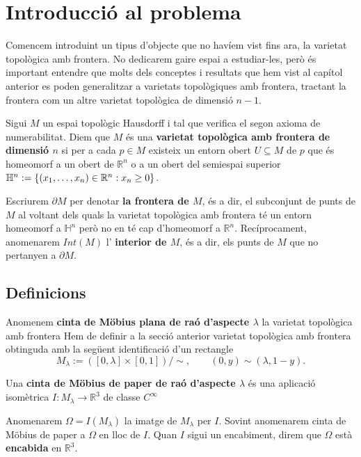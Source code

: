 \section{Introducció al problema}
Comencem introduint un tipus d'objecte que no havíem vist fins ara, la varietat topològica amb frontera. No dedicarem gaire espai a estudiar-les, però és important entendre que molts dels conceptes i resultats que hem vist al capítol anterior es poden generalitzar a varietats topològiques amb frontera, tractant la frontera com un altre varietat topològica de dimensió $n-1$.
\begin{defi}
    Sigui $M$ un espai topològic Hausdorff i tal que verifica el segon axioma de numerabilitat. Diem que $M$ és una \textbf{varietat topològica amb frontera de dimensió $n$} si per a cada $p\in M$ existeix un entorn obert $U\subseteq M$ de $p$ que és homeomorf a un obert de $\mathbb R^n$ o a un obert del semiespai superior $\mathbb H^n := \{(x_1, \dots, x_n)\in\mathbb R^n:x_n\geq 0\}$. 
\end{defi}

\begin{nota}
    Escriurem $\partial M$ per denotar \textbf{la frontera de $M$}, és a dir, el subconjunt de punts de $M$ al voltant dels quals la varietat topològica amb frontera té un entorn homeomorf a $\mathbb H^n$ però no en té cap d'homeomorf a $\mathbb R^n$. Recíprocament, anomenarem $Int(M)$ l' \textbf{interior de $M$}, és a dir, els punts de $M$ que no pertanyen a $\partial M$.
\end{nota}


\subsection{Definicions}
\begin{defi}
    Anomenem \textbf{cinta de Möbius plana de raó d'aspecte $\lambda$} la varietat topològica amb frontera {\color{blue} Hem de definir a la secció anterior varietat topològica amb frontera} obtinguda amb la següent identificació d'un rectangle
    $$M_\lambda := ([0,\lambda] \times [0,1])/\sim, \quad\quad (0,y)\sim(\lambda,1-y).$$
\end{defi}

\begin{defi}\label{def:cinta_mobius_paper}
    Una \textbf{cinta de Möbius de paper de raó d'aspecte $\lambda$} és una aplicació isomètrica $I:M_{\lambda}\to\mathbb R^3$ de classe $C^\infty$
\end{defi}
\begin{nota}
    Anomenarem $\Omega=I(M_\lambda)$ la imatge de $M_\lambda$ per $I$. Sovint anomenarem cinta de Möbius de paper a $\Omega$ en lloc de $I$. Quan $I$ sigui un encabiment, direm que $\Omega$ està \textbf{encabida} en $\mathbb R^3$.
\end{nota}

